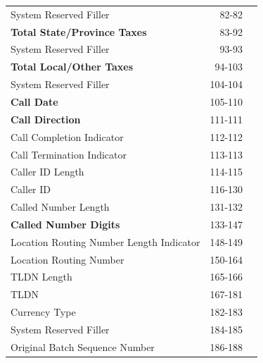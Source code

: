 \documentclass[12pt,twoside]{article}
\begin{document}
\begin{longtable}{lrl}
 System Reserved Filler                    &              82-82  &                        \\
 \textbf{Total State/Province Taxes}       &              83-92  &                        \\
 System Reserved Filler                    &              93-93  &                        \\
 \textbf{Total Local/Other Taxes}          &             94-103  &                        \\
 System Reserved Filler                    &            104-104  &                        \\
 \textbf{Call Date}                        &            105-110  &                        \\
 \textbf{Call Direction}                   &            111-111  &                        \\
 Call Completion Indicator                 &            112-112  &                        \\
 Call Termination Indicator                &            113-113  &                        \\
 Caller ID Length                          &            114-115  &                        \\
 Caller ID                                 &            116-130  &                        \\
 Called Number Length                      &            131-132  &                        \\
 \textbf{Called Number Digits}             &            133-147  &                        \\
 Location Routing Number Length Indicator  &            148-149  &                        \\
 Location Routing Number                   &            150-164  &                        \\
 TLDN Length                               &            165-166  &                        \\
 TLDN                                      &            167-181  &                        \\
 Currency Type                             &            182-183  &                        \\
 System Reserved Filler                    &            184-185  &                        \\
 Original Batch Sequence Number            &            186-188  &                        \\

\end{longtable}
\end{document}

